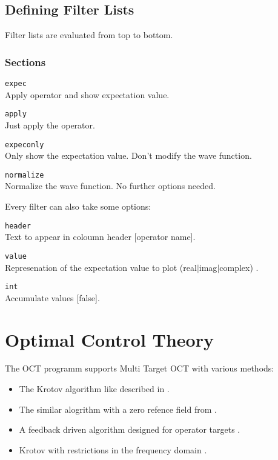 \documentclass[a4paper,12pt]{scrbook}
\newcommand{\option}[2]{\item \texttt{#1}\\ #2}
\begin{document}
\subsection{Defining Filter Lists}
\label{sec:Filters}
Filter lists are evaluated from top to bottom.

\subsubsection*{Sections}
\begin{options}
\option{expec}{Apply operator and show expectation value.}
\option{apply}{Just apply the operator.}
\option{expeconly}{Only show the expectation value. Don't modify the wave function.}
\option{normalize}{Normalize the wave function. No further options needed.}
\end{options}

Every filter can also take some options:
\begin{options}
\option{header}{Text to appear in coloumn header [operator name].}
\option{value}{Represenation of the expectation value to plot (real$|$imag$|$complex) .}
\option{int}{Accumulate values [false].}
\end{options}


\section{Optimal Control Theory}
The OCT programm supports Multi Target OCT with various methods:
\begin{itemize}
 \item The Krotov algorithm like described in \cite{Palao03}.
 \item The similar alogrithm with a zero refence field from \cite{Zhu98}.
 \item A feedback driven algorithm designed for operator targets \cite{Zhu98FB}.
 \item Krotov with restrictions in the frequency domain \cite{Gollub08,Gollub10}.
\end{itemize}
\end{document}

